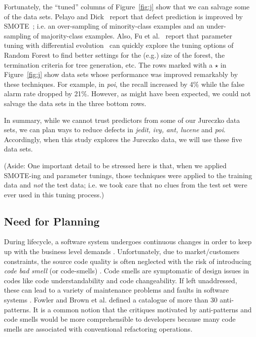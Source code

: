\documentclass{sig-alternate}
\newcommand{\fig}[1]{Figure~\ref{fig:#1}}
\begin{document}
Fortunately, the ``tuned'' columns of \fig{j} show that we can salvage some of the data sets. Pelayo and Dick~\cite{pelayo07} report that defect prediction is improved by SMOTE~\cite{Chawla2002}; i.e. an over-sampling of minority-class examples and an under-sampling of majority-class examples. Also, Fu et al.~\cite{fu:ase15} report that parameter tuning with differential evolution~\cite{storn97} can quickly explore the tuning options of Random Forest to find better settings for the (e.g.) size of the forest, the termination criteria
for tree generation, etc. The rows \colorbox{celadon}{marked with a $\star$} in \fig{j} show data sets whose performance was improved remarkably by these techniques. For example, in {\em poi}, the recall increased by 4\% while the false alarm rate dropped by 21\%. However,  as might have been expected, we could not salvage the data sets in the  three bottom rows.

In summary, while we cannot trust predictors from some of our Jureczko data sets,
we can plan ways to reduce defects in {\em jedit, ivy, ant, lucene} and {\em poi}.
Accordingly, when this study explores the Jureczko data, we will use these five data sets.

(Aside: One important detail to be stressed here is that, when we applied    SMOTE-ing and
parameter tunings, those techniques were applied to the training data and {\em not}
the test data; i.e. we took care that no clues from the test set were ever used in this tuning process.)






 


\subsection{Need for Planning}
During lifecycle, a software system undergoes continuous changes in order to keep up with the business level demands \cite{lehman79}. Unfortunately, due to market/customers constraints, the source code quality is often neglected with the risk of introducing \textit{code bad smell} (or code-smells) \cite{fowler09}. Code smells are symptomatic of design issues in codes like code understandability and code changeability. If left unaddressed, these can lead to a variety of maintenance problems and faults in software systems \cite{fowler09}\cite{marinescu06}. Fowler \cite{fowler09} and Brown et al. \cite{brown98} defined a catalogue of more than 30 anti-patterns. It is a common notion that the critiques motivated by anti-patterns and code smells would be more comprehensible to developers because many code smells are associated with conventional refactoring operations. 
\end{document}
